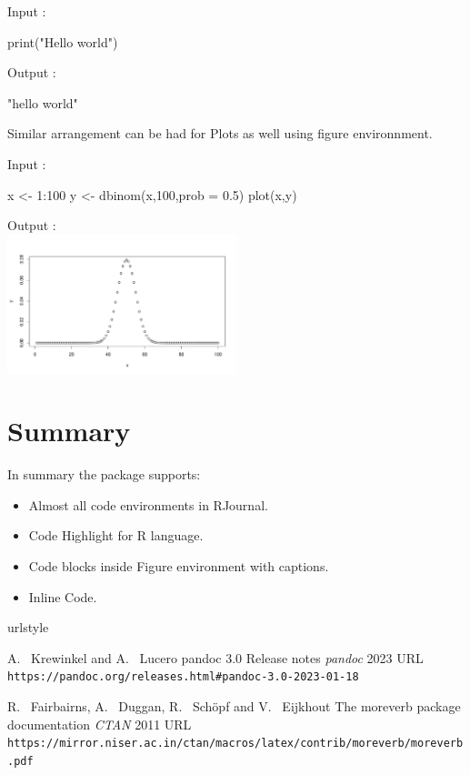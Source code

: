 \begin{Schunk}
Input :
\begin{Sinput}
print("Hello world")
\end{Sinput}
Output :
\begin{Soutput}
[1] "hello world"
\end{Soutput}
\end{Schunk}

Similar arrangement can be had for Plots as well using figure environnment.

\begin{Schunk}
Input :
\begin{Sinput}
x <- 1:100
y <- dbinom(x,100,prob = 0.5)
plot(x,y)
\end{Sinput}
Output :\\
\includegraphics[width=0.5\textwidth]{binom}
\end{Schunk}


\section{Summary}

In summary the  package supports:
\begin{itemize}
\item Almost all code environments in RJournal.
\item Code Highlight for R language.
\item Code blocks inside Figure environment with captions.
\item Inline Code.
\end{itemize}



\begin{thebibliography}{2}
    \providecommand{\natexlab}[1]{#1}
    \providecommand{\url}[1]{\texttt{#1}}
    \expandafter\ifx\csname urlstyle\endcsname\relax
      \providecommand{\doi}[1]{doi: #1}\else
      \providecommand{\doi}{doi: \begingroup \urlstyle{rm}\Url}\fi

A.~ Krewinkel and A.~ Lucero
\newblock pandoc 3.0 Release notes
\newblock \emph{pandoc}  2023
\newblock URL \url{https://pandoc.org/releases.html#pandoc-3.0-2023-01-18}

R.~ Fairbairns, A.~ Duggan, R.~ Schöpf and V.~ Eijkhout
\newblock The moreverb package documentation
\newblock \emph{CTAN}  2011
\newblock URL \url{https://mirror.niser.ac.in/ctan/macros/latex/contrib/moreverb/moreverb.pdf}

\end{thebibliography}


\address{%
Abhishek Ulayil\\
Student, Institute of Actuaries of India\\%
Mumbai, India\\
ORCiD: 0009-0000-6935-8690\\
}
